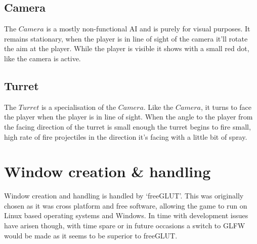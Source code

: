 \documentclass[english]{article}
\begin{document}
\subsection{Camera}
The $Camera$ is a mostly non-functional AI and is purely for visual purposes. It remains stationary, when the player is in line of sight of the camera it'll rotate the aim at the player. While the player is visible it shows with a small red dot, like the camera is active.

\subsection{Turret}
The $Turret$ is a specialisation of the $Camera$. Like the $Camera$, it turns to face the player when the player is in line of sight. When the angle to the player from the facing direction of the turret is small enough the turret begins to fire small, high rate of fire projectiles in the direction it's facing with a little bit of spray.

\section{Window creation \& handling}
Window creation and handling is handled by `freeGLUT'. This was originally chosen as it was cross platform and free software, allowing the game to run on Linux based operating systems and Windows. In time with development issues have arisen though, with time spare or in future occasions a switch to GLFW would be made as it seems to be superior to freeGLUT.
\end{document}
